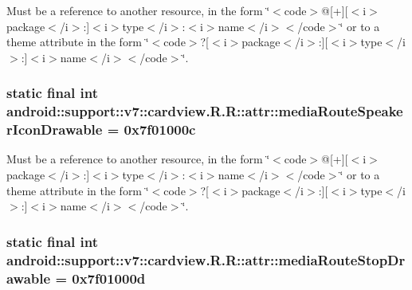 Must be a reference to another resource, in the form \char`\"{}$<$code$>$@\mbox{[}+\mbox{]}\mbox{[}$<$i$>$package$<$/i$>$:\mbox{]}$<$i$>$type$<$/i$>$:$<$i$>$name$<$/i$>$$<$/code$>$\char`\"{} or to a theme attribute in the form \char`\"{}$<$code$>$?\mbox{[}$<$i$>$package$<$/i$>$:\mbox{]}\mbox{[}$<$i$>$type$<$/i$>$:\mbox{]}$<$i$>$name$<$/i$>$$<$/code$>$\char`\"{}. \hypertarget{classandroid_1_1support_1_1v7_1_1cardview_1_1_r_1_1attr_21d2072bca318929a5f1c9e998db1213}{
\subsubsection[{mediaRouteSpeakerIconDrawable}]{\setlength{\rightskip}{0pt plus 5cm}static final int android::support::v7::cardview.R.R::attr::mediaRouteSpeakerIconDrawable = 0x7f01000c}}
\label{classandroid_1_1support_1_1v7_1_1cardview_1_1_r_1_1attr_21d2072bca318929a5f1c9e998db1213}


Must be a reference to another resource, in the form \char`\"{}$<$code$>$@\mbox{[}+\mbox{]}\mbox{[}$<$i$>$package$<$/i$>$:\mbox{]}$<$i$>$type$<$/i$>$:$<$i$>$name$<$/i$>$$<$/code$>$\char`\"{} or to a theme attribute in the form \char`\"{}$<$code$>$?\mbox{[}$<$i$>$package$<$/i$>$:\mbox{]}\mbox{[}$<$i$>$type$<$/i$>$:\mbox{]}$<$i$>$name$<$/i$>$$<$/code$>$\char`\"{}. \hypertarget{classandroid_1_1support_1_1v7_1_1cardview_1_1_r_1_1attr_02097491a2c9f1af6e5fb43e3462c98c}{
\subsubsection[{mediaRouteStopDrawable}]{\setlength{\rightskip}{0pt plus 5cm}static final int android::support::v7::cardview.R.R::attr::mediaRouteStopDrawable = 0x7f01000d}}
\label{classandroid_1_1support_1_1v7_1_1cardview_1_1_r_1_1attr_02097491a2c9f1af6e5fb43e3462c98c}


